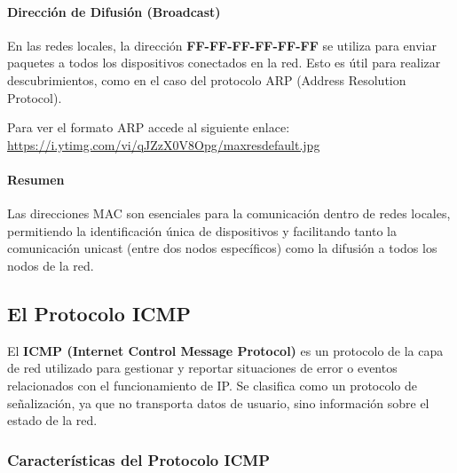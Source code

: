 \documentclass[a4paper,12pt]{article}
\begin{document}
\paragraph{Dirección de Difusión (Broadcast)}

En las redes locales, la dirección \textbf{FF-FF-FF-FF-FF-FF} se utiliza para enviar paquetes a todos los dispositivos conectados en la red. Esto es útil para realizar descubrimientos, como en el caso del protocolo ARP (Address Resolution Protocol).

Para ver el formato ARP accede al siguiente enlace: \url{https://i.ytimg.com/vi/qJZzX0V8Opg/maxresdefault.jpg}

\paragraph{Resumen}

Las direcciones MAC son esenciales para la comunicación dentro de redes locales, permitiendo la identificación única de dispositivos y facilitando tanto la comunicación unicast (entre dos nodos específicos) como la difusión a todos los nodos de la red.



\subsection{El Protocolo ICMP}

El \textbf{ICMP (Internet Control Message Protocol)} es un protocolo de la capa de red utilizado para gestionar y reportar situaciones de error o eventos relacionados con el funcionamiento de IP. Se clasifica como un protocolo de señalización, ya que no transporta datos de usuario, sino información sobre el estado de la red.

\subsubsection*{Características del Protocolo ICMP}
\end{document}
